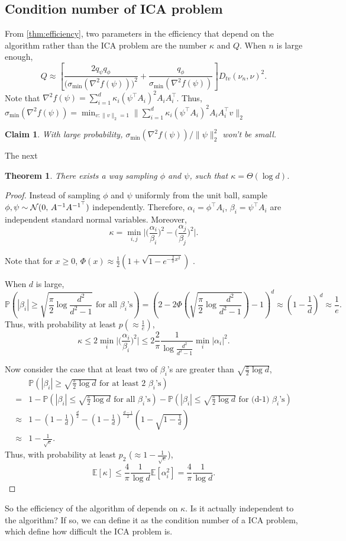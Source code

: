 \documentclass[english]{article} %
\newcommand{\cN}{\cal{N}}
\newcommand{\E}{\mathbb{E}}
\newcommand{\Prob}[1]{\mathbb{P}\left(#1\right)}
\newtheorem{thm}[lemma]{Theorem}
\newtheorem{claim}[lemma]{Claim}
\theoremstyle{definition}
\begin{document}
\subsection{Condition number of ICA problem}
From \cref{thm:efficiency}, two parameters in the efficiency that depend on the algorithm rather than the ICA problem are the number $\kappa$ and $Q$. 
When $n$ is large enough, 
\[
Q\approx \left[ \frac{2q_{\psi}q_{\phi}}{\big(\sigma_{\min}(\nabla^2f(\psi))\big)^2}+\frac{q_{\phi}}{\sigma_{\min}(\nabla^2f(\psi))}\right]D_{tv}(\nu_n , \nu)^2.
\] 
Note that $\nabla^2f(\psi) = \sum_{i=1}^{d} \kappa_i(\psi^{\top}A_i)^2A_iA_i^{\top}$. Thus, $\sigma_{\min}(\nabla^2f(\psi)) = \min_{v:\|v\|_2=1}\|\sum_{i=1}^{d} \kappa_i(\psi^{\top}A_i)^2A_iA_i^{\top}v\|_2$ 

\begin{claim}
With large probability, $\sigma_{\min}(\nabla^2f(\psi))/\|\psi\|_2^2$ won't be small.
\end{claim}

The next
\begin{thm}
There exists a way sampling $\phi$ and $\psi$, such that $\kappa = \Theta(\log d)$.
\end{thm}
\begin{proof}
Instead of sampling $\phi$ and $\psi$ uniformly from the unit ball, sample $\phi,\psi \sim {\cN} (0,\,A^{-1}A^{{-1}^{\top}})$ independently. Therefore, $\alpha_i = \phi^{\top}A_i$, $\beta_i = \psi^{\top}A_i$ are independent standard normal variables. Moreover, 
\[
\kappa  = \min_{i,j} \vert \big(\frac{\alpha_i}{\beta_i}\big)^2 - \big(\frac{\alpha_j}{\beta_j}\big)^2 \vert.
\] 

Note that for $x\ge0$, $\Phi(x) \approx \frac12 (1+\sqrt{1-e^{-\frac{2}{\pi}x^2}})$ \citep{aludaat2008note}.
 
 When $d$ is large,
\[
\Prob{|\beta_i| \ge \sqrt{\frac{\pi}{2}\log \frac{d^2}{d^2-1}} \text{ for all } \beta_i\text{'s}} = (2- 2\Phi(\sqrt{\frac{\pi}{2}\log \frac{d^2}{d^2-1}})-1)^d \approx \left(1-\frac{1}{d}\right)^d \approx \frac{1}{e}.
\]
Thus, with probability at least $p (\approx \frac{1}{e})$,
\[
\kappa \le 2 \min_i \vert \big(\frac{\alpha_i}{\beta_i}\big)^2\vert \le 2 \frac{2}{\pi}\frac{1}{\log \frac{d^2}{d^2-1}}\min_i |\alpha_i|^2.
\]

Now consider the case that at least two of $\beta_i$'s are greater than $\sqrt{\frac{\pi}{2}\log d}$,
\begin{align*}
& \Prob{|\beta_i| \ge \sqrt{\frac{\pi}{2}\log d} \text{ for at least 2 } \beta_i\text{'s}} \\
=  & 1 - \Prob{|\beta_i| \le \sqrt{\frac{\pi}{2}\log d} \text{ for all } \beta_i\text{'s}} - \Prob{|\beta_i| \le \sqrt{\frac{\pi}{2}\log d} \text{ for (d-1) } \beta_i\text{'s}} \\
\approx & 1 - (1-\frac{1}{d})^{\frac{d}{2}} -  (1-\frac{1}{d})^{\frac{d-1}{2}}(1-\sqrt{1-\frac{1}{d}}) \\
\approx & 1 -\frac{1}{\sqrt{e}}.
\end{align*}
Thus, with probability at least $p_2$ ($\approx 1-\frac{1}{\sqrt{e}}$),
\[
\E[\kappa] \le \frac{4}{\pi} \frac{1}{\log d} \E[\alpha_i^2] = \frac{4}{\pi} \frac{1}{\log d}.
\]
\end{proof}

So the efficiency of the algorithm of \citet{DHsu2012} depends on $\kappa$. Is it actually independent to the algorithm? If so, we can define it as the condition number of a ICA problem, which define how difficult the ICA problem is. 



\end{document}
